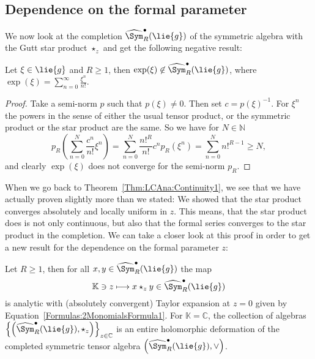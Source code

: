 \subsection{Dependence on the formal parameter}

We now look at the completion $\widehat{\Sym}_R^{\bullet}(\lie{g})$ of
the symmetric algebra with the Gutt star product $\star_z$ and 
get the following negative result:
\begin{proposition}
    \label{proposition:NoExponentialsSorry}%
    Let $\xi \in \lie{g}$ and $R \geq 1$, then $\exp(\xi) \not\in
    \widehat{\Sym}_R^{\bullet}(\lie{g})$, where $\exp(\xi) =
    \sum_{n=0}^{\infty} \frac{\xi^n}{n!}$.
\end{proposition}
\begin{proof}
    Take a semi-norm $p$ such that $p(\xi) \neq 0$. Then set $c =
    p(\xi)^{-1}$. For $\xi^n$ the powers in the sense of either the
    usual tensor product, or the symmetric product or the star product
    are the same. So we have for $N \in \mathbb{N}$
    \begin{equation*}
        p_R \left(
        \sum\limits_{n=0}^N
        \frac{c^n}{n!} \xi^n
        \right)
        =
        \sum\limits_{n=0}^N
        \frac{n!^R}{n!}
        c^n
        p_R \left( \xi^n
        \right)
        =
        \sum\limits_{n=0}^N
        n!^{R - 1}
        \geq
        N,
    \end{equation*}
    and clearly $\exp(\xi)$ does not converge for the semi-norm $p_R$.
\end{proof}
When we go back to Theorem~\ref{Thm:LCAna:Continuity1}, we see that we have 
actually proven slightly more than we stated: We showed that the star product 
converges absolutely and locally uniform in $z$. This means, that the star 
product does is not only continuous, but also that the formal series converges 
to the star product in the completion. We can take a closer look at this proof 
in order to get a new result for the dependence on the formal parameter $z$:
\begin{proposition}
    \label{corollary:HolomorphicDependence}%
    Let $R \geq 1$, then for all $x, y \in \widehat{\Sym}_R^\bullet(\lie{g})$ 
    the map
    \begin{equation}
        \label{LCAna:Holomorphicity}
        \mathbb{K} \ni z
        \longmapsto
        x \star_z y \in
        \widehat{\Sym}_R^\bullet(\lie{g})
    \end{equation}
    is analytic with (absolutely convergent) Taylor expansion at $z = 0$ 
    given by Equation~\eqref{Formulas:2MonomialsFormula1}. For 
    $\mathbb{K} = \mathbb{C}$, the collection of algebras $\left\{ \left( 
    \widehat{\Sym}_R^\bullet(\lie{g}), \star_z \right) \right\}_{z \in 
    \mathbb{C}}$ is an entire holomorphic deformation of the completed 
    symmetric tensor algebra $\left( \widehat{\Sym}_R^\bullet(\lie{g}), \vee 
    \right)$.
\end{proposition}
